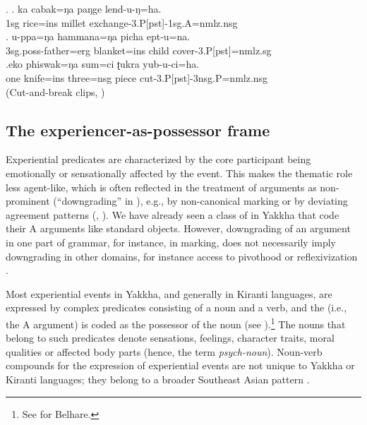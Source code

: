 \ex. \ag. ka cabak=ŋa paŋge lend-u-ŋ=ha.\\
		1sg rice{\sc =ins} millet exchange-{\sc 3.P[pst]-1sg.A=nmlz.nsg}	\\
	\bg. u-ppa=ŋa hammana=ŋa picha ept-u=na.\\
	{\sc 3sg.poss-}father{\sc =erg}  blanket{\sc =ins} child cover{\sc -3.P[pst]=nmlz.sg}\\
\bg.eko phiswak=ŋa sum=ci ʈukra yub-u-ci=ha.\\
one knife{\sc =ins} three{\sc =nsg} piece cut{\sc -3.P[pst]-3nsg.P=nmlz.nsg}\\
 (Cut-and-break clips, \citealt{Bohnemeyeretal2010_cut})

\subsection{The experiencer-as-possessor frame}\label{exp}



\noindent
Experiential predicates are characterized by the core participant being emotionally or sensationally affected by the event. This makes the thematic role  less agent-like, which is often reflected in the treatment of  arguments as non-prominent (“downgrading” in \citealt{Bickel2004The-syntax}), e.g., by non-canonical  marking or by deviating agreement patterns (\citealt[22]{Levinetal2005_Argument}, \citealt[185]{Naess2007_Prototypical}). We have already seen a class of  in Yakkha that code their A arguments like standard objects. However, downgrading of an argument in one part of grammar, for instance, in  marking, does not necessarily imply downgrading in other domains, for instance access to pivothood or reflexivization \citep[77]{Bickel2004The-syntax}.

Most experiential events in Yakkha, and generally in Kiranti languages, are expressed by complex predicates consisting of a noun and a verb, and the 
 (i.e., the A argument) is coded as the possessor of the noun (see ).\footnote{See \citet{Bickel1997The-possessive} for Belhare.} 
The nouns that belong to such predicates denote sensations,  feelings,  character traits, moral qualities or affected body parts (hence, the term \emph{psych-noun}). 
Noun-verb compounds for the expression of experiential events are not unique to Yakkha or Kiranti languages; they belong to a broader Southeast Asian 
pattern \citep{Matisoff1986Hearts}. 

